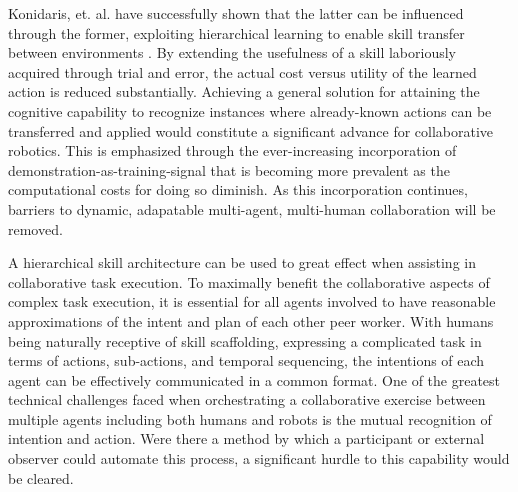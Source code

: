 \documentclass[letterpaper]{article}
\begin{document}
Konidaris, et. al. have successfully shown that the latter can be influenced through the former, exploiting hierarchical learning to enable skill transfer between environments \cite{AutoSkillAcquisition}. By extending the usefulness of a skill laboriously acquired through trial and error, the actual cost versus utility of the learned action is reduced substantially. Achieving a general solution for attaining the cognitive capability to recognize instances where already-known actions can be transferred and applied would constitute a significant advance for collaborative robotics. This is emphasized through the ever-increasing incorporation of demonstration-as-training-signal that is becoming more prevalent as the computational costs for doing so diminish. As this incorporation continues, barriers to dynamic, adapatable multi-agent, multi-human collaboration will be removed. 
	
A hierarchical skill architecture can be used to great effect when assisting in collaborative task execution. To maximally benefit the collaborative aspects of complex task execution, it is essential for all agents involved to have reasonable approximations of the intent and plan of each other peer worker. With humans being naturally receptive of skill scaffolding, expressing a complicated task in terms of actions, sub-actions, and temporal sequencing, the intentions of each agent can be effectively communicated in a common format. One of the greatest technical challenges faced when orchestrating a collaborative exercise between multiple agents including both humans and robots is the mutual recognition of intention and action. Were there a method by which a participant or external observer could automate this process, a significant hurdle to this capability would be cleared.
 
\end{document}
